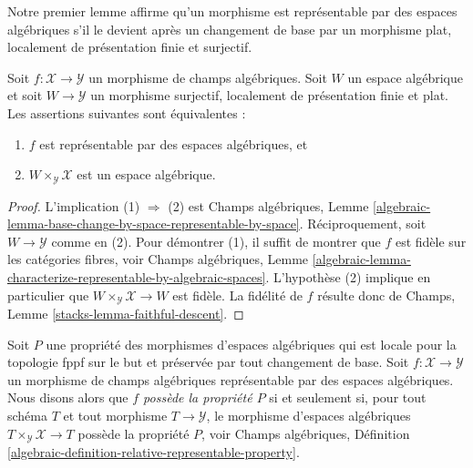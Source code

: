 \medskip\noindent
Notre premier lemme affirme qu'un morphisme est représentable par des espaces algébriques
s'il le devient après un changement de base par un morphisme plat,
localement de présentation finie et surjectif.

\begin{lemma}
\label{lemma-check-representable-covering}
Soit $f : \mathcal{X} \to \mathcal{Y}$ un morphisme de champs algébriques.
Soit $W$ un espace algébrique et soit $W \to \mathcal{Y}$ un morphisme surjectif,
localement de présentation finie et plat. Les assertions suivantes sont équivalentes :
\begin{enumerate}
\item $f$ est représentable par des espaces algébriques, et
\item $W \times_\mathcal{Y} \mathcal{X}$ est un espace algébrique.
\end{enumerate}
\end{lemma}

\begin{proof}
L'implication (1) $\Rightarrow$ (2) est
Champs algébriques,
Lemme \ref{algebraic-lemma-base-change-by-space-representable-by-space}.
Réciproquement, soit $W \to \mathcal{Y}$ comme en (2). Pour démontrer (1), il
suffit de montrer que $f$ est fidèle sur les catégories fibres, voir
Champs algébriques,
Lemme \ref{algebraic-lemma-characterize-representable-by-algebraic-spaces}.
L'hypothèse (2) implique en particulier que
$W \times_\mathcal{Y} \mathcal{X} \to W$ est fidèle.
La fidélité de $f$ résulte donc de
Champs, Lemme \ref{stacks-lemma-faithful-descent}.
\end{proof}

\noindent
Soit $P$ une propriété des morphismes d'espaces algébriques qui est
locale pour la topologie fppf sur le but et préservée par tout changement de base.
Soit $f : \mathcal{X} \to \mathcal{Y}$ un morphisme de champs algébriques
représentable par des espaces algébriques. Nous disons alors que
{\it $f$ possède la propriété $P$} si et seulement si, pour tout schéma $T$
et tout morphisme $T \to \mathcal{Y}$, le morphisme d'espaces algébriques
$T \times_\mathcal{Y} \mathcal{X} \to T$ possède la propriété $P$, voir
Champs algébriques,
Définition \ref{algebraic-definition-relative-representable-property}.

